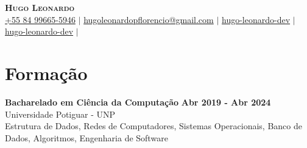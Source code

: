 \documentclass[letterpaper,11pt]{article}
\newcommand{\resumeSubHeadingListStart}{\begin{itemize}[leftmargin=0.15in, label={}]}
\newcommand{\resumeSubHeadingListEnd}{\end{itemize}}
\begin{document}

\begin{center}
    \textbf{\Huge \scshape Hugo Leonardo} \\ \vspace{3pt}
    \small
    \faMobile \hspace{.5pt} \href{tel:5584996655946}{+55 84 99665-5946}
    $|$
    \faAt \hspace{.5pt} \href{mailto:hugoleonardopflorencio@gmail.com}{hugoleonardopflorencio@gmail.com}
    $|$
    \faLinkedinSquare \hspace{.5pt} \href{https://www.linkedin.com/in/hugo-leonardo-dev/}{hugo-leonardo-dev}
    $|$
    \faGithub \hspace{.5pt} \href{https://github.com/hugo-leonardo-dev}{hugo-leonardo-dev}
    $|$
\end{center}






\section{Formação}
\vspace{3pt}
\noindent
\textbf{Bacharelado em Ciência da Computação} \hfill \textbf{Abr 2019 - Abr 2024} \\
Universidade Potiguar - UNP \\
Estrutura de Dados, Redes de Computadores, Sistemas Operacionais, Banco de Dados, Algoritmos, Engenharia de Software
\end{document}
